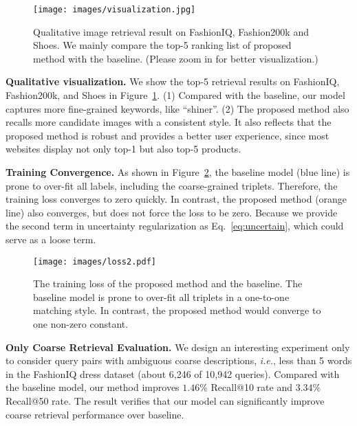 \documentclass[10pt,twocolumn,letterpaper]{article}
\def\ie{\emph{i.e.}}
\begin{document}
\begin{figure}[t]
\begin{center}\vspace{-.1in}
\texttt{[image: images/visualization.jpg]}
\vspace{-.2in}
\caption{Qualitative image retrieval result on FashionIQ, Fashion200k and Shoes. We mainly compare the top-5 ranking list of proposed method with the baseline. (Please zoom in for better visualization.)}
\label{fig:visualization}
\vspace{-.2in}
\end{center}
\end{figure}


\noindent\textbf{Qualitative visualization.}
We show the top-5 retrieval results on FashionIQ, Fashion200k, and Shoes in Figure~\ref{fig:visualization}. 
(1) Compared with the baseline, our model captures more fine-grained keywords, like ``shiner''.
(2) The proposed method also recalls more candidate images with a consistent style. It also reflects that the proposed method is robust and provides a better user experience, since most websites display not only top-1 but also top-5 products. 

\noindent\textbf{Training Convergence.} As shown in Figure~\ref{fig:loss}, the baseline model (blue line) is prone to over-fit all labels, including the coarse-grained triplets. Therefore, the training loss converges to zero quickly. In contrast, the proposed method (orange line) also converges, but does not force the loss to be zero. Because we provide the second term in uncertainty regularization as Eq.~\ref{eq:uncertain}, which could serve as a loose term. 

\begin{figure}[t]
\begin{center}
\texttt{[image: images/loss2.pdf]}
\vspace{-.2in}
\caption{The training loss of the proposed method and the baseline. The baseline model is prone to over-fit all triplets in a one-to-one matching style. In contrast, the proposed method would converge to one non-zero constant.}
\label{fig:loss}\vspace{-.2in}
\end{center}
\end{figure}

\noindent\textbf{Only Coarse Retrieval Evaluation.} We design an interesting experiment only to consider query pairs with ambiguous coarse descriptions, \ie, less than 5 words in the FashionIQ dress dataset (about 6,246 of 10,942 queries). Compared with the baseline model, our method improves $1.46\%$ Recall@10 rate and $3.34\%$ Recall@50 rate. The result verifies that our model can significantly improve coarse retrieval performance over baseline.
\end{document}
